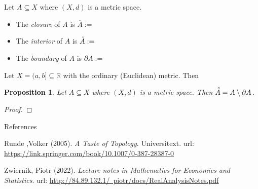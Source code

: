 \documentclass [aspectratio=169]{beamer}
\newcommand{\R}{{\mathbb{R}}}
\newcommand{\interior}{\accentset{\circ}}
\newtheorem{proposition}[theorem]{Proposition}
\begin{document}
\begin{frame}
\begin{definition}
Let $A\subseteq X$ where $(X,d)$ is a metric space. 
\begin{itemize}
\setlength\itemsep{1em}
    \item The \emph{closure} of $A$ is $\overline A :=$
    \item The \emph{interior} of $A$ is  $\interior A :=$
    \item The \emph{boundary} of $A$ is $\partial A :=$
\end{itemize}
\vspace{2em}
\end{definition}

\vspace{0.5em}

\begin{example}
Let $X = (a, b] \subseteq \R$ with the ordinary (Euclidean) metric. Then

\vspace{1cm}
\end{example}
\end{frame}


\begin{frame}
\begin{proposition}
 Let $A\subseteq X$ where $(X,d)$ is a metric space. Then $\interior A = A \setminus \partial A$.
\end{proposition}
\begin{proof}
\vspace{5cm}
\end{proof}
\end{frame}


\begin{frame}{References}

Runde ,Volker (2005). \textit{A Taste of Topology}. Universitext.  url:  \href{https://link.springer.com/book/10.1007/0-387-28387-0}{https://link.springer.com/book/10.1007/0-387-28387-0} 

\vspace{1em}

Zwiernik, Piotr (2022). \textit{Lecture notes in Mathematics for Economics and Statistics}. url: \href{http://84.89.132.1/~piotr/docs/RealAnalysisNotes.pdf}{http://84.89.132.1/~piotr/docs/RealAnalysisNotes.pdf} \\

\end{frame}
\end{document}
